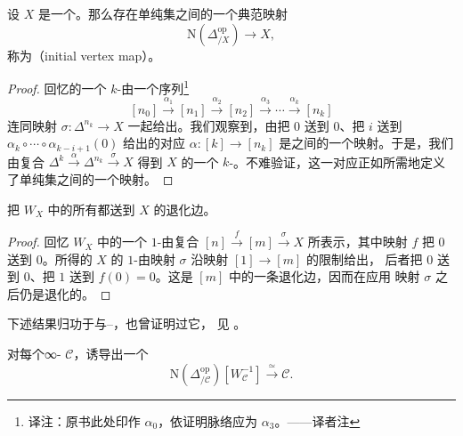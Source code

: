 \begin{lemma}\label{lem:initial-vertex-map}
设 $X$ 是一个\trSimplicialSet{}。那么存在单纯集之间的一个典范映射
\[
\mathrm{N}(\Delta^{\mathrm{op}}_{/X}) \to X,
\]
称为\emph{\trInitialVertexMap{}}（initial vertex map）。
\end{lemma}

\begin{proof}
回忆\trNerve{}的一个 $k$-\trSimplex{}由一个序列\footnote{译注：原书此处印作
$\alpha_0$，依证明脉络应为 $\alpha_3$。——译者注}
\[
[n_0] \xrightarrow{\alpha_1} [n_1] \xrightarrow{\alpha_2} [n_2]
\xrightarrow{\alpha_3} \cdots \xrightarrow{\alpha_k} [n_k]
\]
连同映射 $\sigma\colon \Delta^{n_k} \to X$ 一起给出。我们观察到，由把 $0$ 送到
$0$、把 $i$ 送到 $\alpha_k \circ \cdots \circ \alpha_{k-i+1}(0)$ 给出的对应
$\alpha\colon [k] \to [n_k]$ 是\trLinearlyOrderedSet{}之间的一个映射。于是，我们
由复合 $\Delta^k \xrightarrow{\alpha} \Delta^{n_k} \xrightarrow{\sigma} X$ 得到
$X$ 的一个 $k$-\trSimplex{}。不难验证，这一对应正如所需地定义了单纯集之间的一个映射。
\end{proof}

\begin{lemma}\label{lem:initial-vertex-degenerate}
\trInitialVertexMap{}把 $W_X$ 中的所有\trMorphism{}都送到 $X$ 的退化边。
\end{lemma}

\begin{proof}
回忆 $W_X$ 中的一个 $1$-\trSimplex{}由复合
$[n] \xrightarrow{f} [m] \xrightarrow{\sigma} X$ 所表示，其中映射 $f$ 把 $0$ 送到
$0$。所得的 $X$ 的 $1$-\trSimplex{}由映射 $\sigma$ 沿映射 $[1] \to [m]$ 的限制给出，
后者把 $0$ 送到 $0$、把 $1$ 送到 $f(0) = 0$。这是 $[m]$ 中的一条退化边，因而在应用
映射 $\sigma$ 之后仍是退化的。
\end{proof}

下述结果归功于\trJoyal{}与\trDwyer{}--\trKan{}，\trStevenson{}也曾证明过它，
见 \cite[Theorem 1.3]{Ste17}。

\begin{theorem}\label{thm:initial-vertex-joyal-equivalence}
对每个∞-\trCategory{} $\mathcal{C}$，\trInitialVertexMap{}诱导出一个\trJoyalEquivalence{}%
\[
\mathrm{N}(\Delta^{\mathrm{op}}_{/\mathcal{C}})[W_\mathcal{C}^{-1}]
\xrightarrow{\ \simeq\ }
\mathcal{C}.
\]
\end{theorem}


